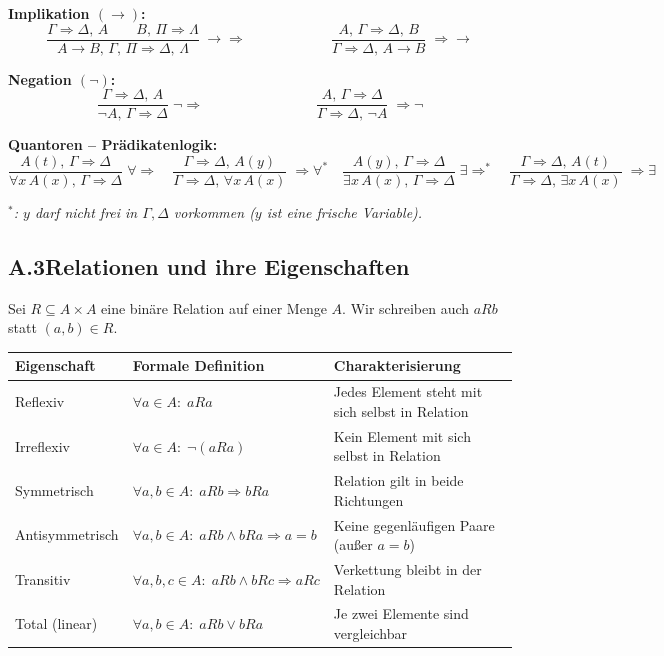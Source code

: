 \medskip
\noindent\textbf{Implikation $(\to)$:}
\[
\dfrac{\Gamma \Rightarrow \Delta,\,A \qquad B,\,\Pi \Rightarrow \Lambda}{A \to B,\,\Gamma,\,\Pi \Rightarrow \Delta,\,\Lambda}\;\to\Rightarrow
\qquad\qquad\qquad
\dfrac{A,\,\Gamma \Rightarrow \Delta,\,B}{\Gamma \Rightarrow \Delta,\,A \to B}\;\Rightarrow\to
\]

\medskip
\noindent\textbf{Negation $(\neg)$:}
\[
\dfrac{\Gamma \Rightarrow \Delta,\,A}{\neg A,\,\Gamma \Rightarrow \Delta}\;\neg\Rightarrow
\qquad\qquad\qquad\qquad
\dfrac{A,\,\Gamma \Rightarrow \Delta}{\Gamma \Rightarrow \Delta,\,\neg A}\;\Rightarrow\neg
\]

\medskip
\noindent\textbf{Quantoren -- Prädikatenlogik:}
\[
\dfrac{A(t),\,\Gamma \Rightarrow \Delta}{\forall x\,A(x),\,\Gamma \Rightarrow \Delta}\;\forall\Rightarrow
\quad
\dfrac{\Gamma \Rightarrow \Delta,\,A(y)}{\Gamma \Rightarrow \Delta,\,\forall x\,A(x)}\;\Rightarrow\forall^*
\quad
\dfrac{A(y),\,\Gamma \Rightarrow \Delta}{\exists x\,A(x),\,\Gamma \Rightarrow \Delta}\;\exists\Rightarrow^*
\quad
\dfrac{\Gamma \Rightarrow \Delta,\,A(t)}{\Gamma \Rightarrow \Delta,\,\exists x\,A(x)}\;\Rightarrow\exists
\]

\noindent\textit{${}^*$: $y$ darf nicht frei in $\Gamma, \Delta$ vorkommen ($y$ ist eine \emph{frische} Variable).}

\newpage
\subsection*{A.3\quad Relationen und ihre Eigenschaften}

Sei $R \subseteq A \times A$ eine binäre Relation auf einer Menge $A$. Wir schreiben auch $aRb$ statt $(a,b)\in R$.

\medskip
\begin{center}
\renewcommand{\arraystretch}{1.6}
\begin{tabularx}{\textwidth}{l X l}
\textbf{Eigenschaft} & \textbf{Formale Definition} & \textbf{Charakterisierung} \\
\hline
Reflexiv         & $\forall a \in A:\; aRa$ & Jedes Element steht mit sich selbst in Relation \\
Irreflexiv       & $\forall a \in A:\; \neg(aRa)$ & Kein Element mit sich selbst in Relation \\
Symmetrisch      & $\forall a,b \in A:\; aRb \Rightarrow bRa$ & Relation gilt in beide Richtungen \\
Antisymmetrisch  & $\forall a,b \in A:\; aRb \wedge bRa \Rightarrow a=b$ & Keine gegenläufigen Paare (außer $a=b$) \\
Transitiv        & $\forall a,b,c \in A:\; aRb \wedge bRc \Rightarrow aRc$ & Verkettung bleibt in der Relation \\
Total (linear)   & $\forall a,b \in A:\; aRb \vee bRa$ & Je zwei Elemente sind vergleichbar \\
\end{tabularx}
\end{center}

